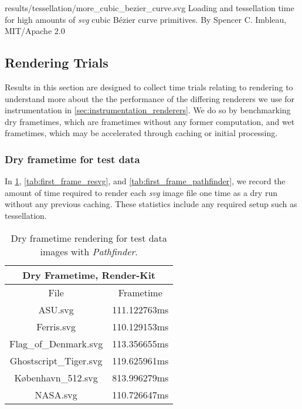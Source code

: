 \widesvg
{results/tessellation/more_cubic_bezier_curve.svg}
{Loading and tessellation time for high amounts of \textit{svg} cubic Bézier curve primitives.\label{fig:more_cubic_curve}}
{By Spencer C. Imbleau, MIT/Apache 2.0}


\subsection{Rendering Trials}\label{sec:results_rendering}
Results in this section are designed to collect time trials relating to rendering to understand more about the the performance of the differing renderers we use for instrumentation in \cref{sec:instrumentation_renderers}. We do so by benchmarking dry frametimes, which are frametimes without any former computation, and wet frametimes, which may be accelerated through caching or initial processing.

\subsubsection{Dry frametime for test data}
In \cref{tab:first_frame_renderkit}, \cref{tab:first_frame_resvg}, and \cref{tab:first_frame_pathfinder}, we record the amount of time required to render each \textit{svg} image file one time as a dry run without any previous caching. These statistics include any required setup such as tessellation.\medskip

\begin{table}[H]
\centering
\begin{tabular}{ |c|c| }
\hline
\multicolumn{2}{|c|}{Dry Frametime, Render-Kit}\\
\hline
File&Frametime\\
\hline
ASU.svg&111.122763ms\\
\hline
Ferris.svg&110.129153ms\\
\hline
Flag\_of\_Denmark.svg&113.356655ms\\
\hline
Ghostscript\_Tiger.svg&119.625961ms\\
\hline
København\_512.svg&813.996279ms\\
\hline
NASA.svg&110.726647ms\\
\hline
\end{tabular}
\caption{Dry frametime rendering for test data images with \textit{Pathfinder}.\label{tab:first_frame_renderkit}}
\end{table}
\medskip

